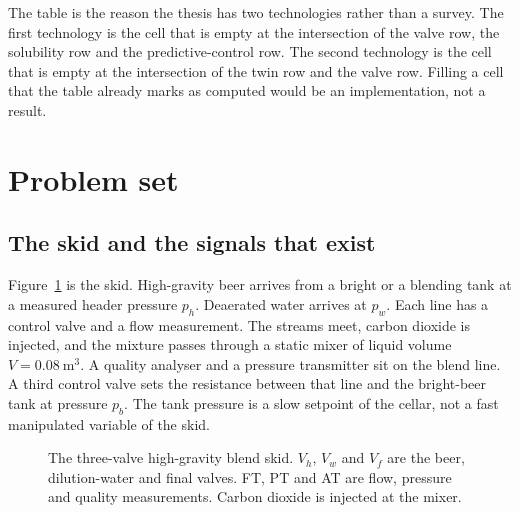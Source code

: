 The table is the reason the thesis has two technologies rather than a survey. The first technology is the cell that is empty at the intersection of the valve row, the solubility row and the predictive-control row. The second technology is the cell that is empty at the intersection of the twin row and the valve row. Filling a cell that the table already marks as computed would be an implementation, not a result.

\section{Problem set}
\label{sec:problem}

\subsection{The skid and the signals that exist}

Figure~\ref{fig:pid} is the skid. High-gravity beer arrives from a bright or a blending tank at a measured header pressure $p_h$. Deaerated water arrives at $p_w$. Each line has a control valve and a flow measurement. The streams meet, carbon dioxide is injected, and the mixture passes through a static mixer of liquid volume $V=\SI{0.08}{\cubic\metre}$. A quality analyser and a pressure transmitter sit on the blend line. A third control valve sets the resistance between that line and the bright-beer tank at pressure $p_b$. The tank pressure is a slow setpoint of the cellar, not a fast manipulated variable of the skid.

\begin{figure}[htbp]
\centering
{}
\caption{The three-valve high-gravity blend skid. $V_h$, $V_w$ and $V_f$ are the beer, dilution-water and final valves. FT, PT and AT are flow, pressure and quality measurements. Carbon dioxide is injected at the mixer.}
\label{fig:pid}
\end{figure}

